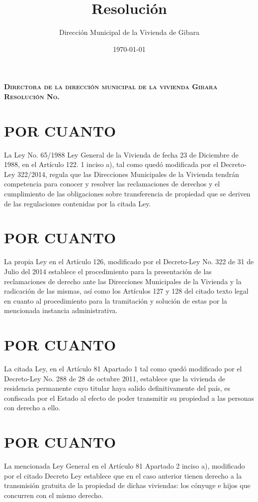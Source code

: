 \documentclass[11pt,letterpaper]{article}
\author{Dirección Municipal de la Vivienda de Gibara}
\title{Resolución}
\date{\today}
\begin{document}
    \begin{figure}[t]
        \raggedright
        \def\svgwidth{0.85cm}
        
    \end{figure}
    \setlength{\textfloatsep}{2.5pt}
    \begin{flushleft}
        \textbf{\textsc{Directora de la dirección municipal de la vivienda Gibara}} \\ 
        \textbf{\textsc{Resolución No.}}
        \underline{\hspace {2cm}}  \\           
    \end{flushleft}
    \vspace{-2em}
    \section{POR CUANTO}
    La Ley No. 65/1988  Ley General de la Vivienda de fecha 23 de Diciembre de 1988, en el Artículo 122. 1 inciso a), tal como quedó modificada por el Decreto-Ley 322/2014, regula que las Direcciones Municipales de la Vivienda tendrán competencia para conocer y resolver las reclamaciones de derechos y el cumplimiento de las obligaciones sobre transferencia de propiedad que se deriven de las regulaciones contenidas por la citada Ley.
    \section{POR CUANTO}
        La propia Ley en el Artículo 126, modificado por el Decreto-Ley No. 322 de  31 de Julio del 2014 establece el procedimiento para la presentación de las reclamaciones de derecho ante las Direcciones Municipales de la Vivienda y la radicación de las mismas, así como los Artículos 127 y 128 del citado texto legal en cuanto al procedimiento para la tramitación y solución de estas por la mencionada instancia administrativa.
    \section{POR CUANTO}
        La citada Ley,  en el Artículo 81 Apartado 1 tal como quedó modificado por el Decreto-Ley No. 288 de 28 de octubre 2011, establece que la vivienda de residencia permanente cuyo titular haya salido definitivamente del país, es confiscada por el Estado al efecto de poder transmitir su propiedad a las personas con derecho a ello.    
    \section{POR CUANTO}
        La mencionada Ley General en el Artículo 81 Apartado 2 inciso a), modificado por el citado Decreto Ley establece que en el caso anterior tienen derecho a la transmisión gratuita de la propiedad de dichas viviendas: los cónyuge e hijos que concurren con el mismo derecho.
\end{document}

